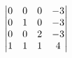 \documentclass[preview]{standalone}
\begin{document}
\begin{align*}
\special{dvisvgm:raw <g id='unique000'>}\begin{vmatrix}0&0&0&-3\\0&1&0&-3\\0&0&2&-3\\1&1&1&4\end{vmatrix}\special{dvisvgm:raw </g>}
\end{align*}
\end{document}
